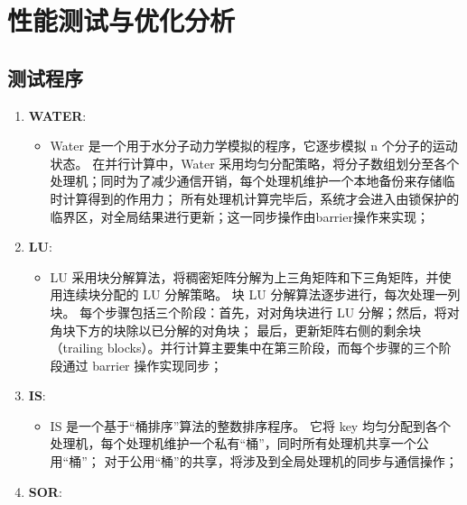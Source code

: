 \chapter{性能测试与优化分析}\label{chap:experiments}{
    \section{测试程序}\label{sec:测试程序}


    \begin{enumerate}[leftmargin=1em, align=left]
        \item \textbf{WATER}:
              \begin{itemize}[leftmargin=*, nosep]
                  \item Water 是一个用于水分子动力学模拟的程序，它逐步模拟 n 个分子的运动状态。
                        在并行计算中，Water 采用均匀分配策略，将分子数组划分至各个处理机；同时为了减少通信开销，每个处理机维护一个本地备份来存储临时计算得到的作用力；
                        所有处理机计算完毕后，系统才会进入由锁保护的临界区，对全局结果进行更新；这一同步操作由barrier操作来实现；
              \end{itemize}
        \item \textbf{LU}:
              \begin{itemize}[leftmargin=*, nosep]
                  \item LU 采用块分解算法，将稠密矩阵分解为上三角矩阵和下三角矩阵，并使用连续块分配的 LU 分解策略。
                        块 LU 分解算法逐步进行，每次处理一列块。
                        每个步骤包括三个阶段：首先，对对角块进行 LU 分解；然后，将对角块下方的块除以已分解的对角块；
                        最后，更新矩阵右侧的剩余块（trailing blocks）。并行计算主要集中在第三阶段，而每个步骤的三个阶段通过 barrier 操作实现同步；
              \end{itemize}
        \item \textbf{IS}:
              \begin{itemize}[leftmargin=*, nosep]
                  \item IS 是一个基于“桶排序”算法的整数排序程序。
                        它将 key 均匀分配到各个处理机，每个处理机维护一个私有“桶”，同时所有处理机共享一个公用“桶”；
                        对于公用“桶”的共享，将涉及到全局处理机的同步与通信操作；
              \end{itemize}
        \item \textbf{SOR}:
              \begin{itemize}[leftmargin=*, nosep]

\end{itemize}
\end{enumerate}}
